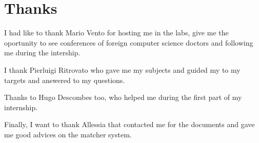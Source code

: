 \chapter*{Thanks}
\par I had like to thank Mario Vento for hosting me in the labs, give me the oportunity to see conferences of foreign computer science doctors and following me during the intership.	
\par I thank Pierluigi Ritrovato who gave me my subjects and guided my to my targets and answered to my questions.
\par Thanks to Hugo Descombes too, who helped me during the first part of my internship. 
\par Finally, I want to thank Allessia that contacted me for the documents and gave me good advices on the matcher system.